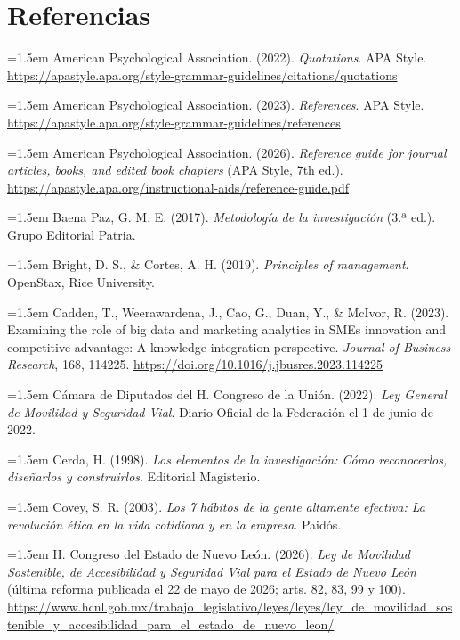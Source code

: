 {\clearpage\section*{Referencias}
\begingroup\small
\setlength{\parindent}{0pt}
\setlength{\parskip}{4pt}
\hangindent=1.5em American Psychological Association. (2022). \textit{Quotations}. APA Style. \url{https://apastyle.apa.org/style-grammar-guidelines/citations/quotations}

\hangindent=1.5em American Psychological Association. (2023). \textit{References}. APA Style. \url{https://apastyle.apa.org/style-grammar-guidelines/references}

\hangindent=1.5em American Psychological Association. (2026). \textit{Reference guide for journal articles, books, and edited book chapters} (APA Style, 7th ed.). \url{https://apastyle.apa.org/instructional-aids/reference-guide.pdf}

\hangindent=1.5em Baena Paz, G. M. E. (2017). \textit{Metodología de la investigación} (3.ª ed.). Grupo Editorial Patria.

\hangindent=1.5em Bright, D. S., \& Cortes, A. H. (2019). \textit{Principles of management}. OpenStax, Rice University.

\hangindent=1.5em Cadden, T., Weerawardena, J., Cao, G., Duan, Y., \& McIvor, R. (2023). Examining the role of big data and marketing analytics in SMEs innovation and competitive advantage: A knowledge integration perspective. \textit{Journal of Business Research}, 168, 114225. \url{https://doi.org/10.1016/j.jbusres.2023.114225}

\hangindent=1.5em Cámara de Diputados del H. Congreso de la Unión. (2022). \textit{Ley General de Movilidad y Seguridad Vial}. Diario Oficial de la Federación el 1 de junio de 2022.

\hangindent=1.5em Cerda, H. (1998). \textit{Los elementos de la investigación: Cómo reconocerlos, diseñarlos y construirlos}. Editorial Magisterio.

\hangindent=1.5em Covey, S. R. (2003). \textit{Los 7 hábitos de la gente altamente efectiva: La revolución ética en la vida cotidiana y en la empresa}. Paidós.

\hangindent=1.5em H. Congreso del Estado de Nuevo León. (2026). \textit{Ley de Movilidad Sostenible, de Accesibilidad y Seguridad Vial para el Estado de Nuevo León} (última reforma publicada el 22 de mayo de 2026; arts. 82, 83, 99 y 100). \url{https://www.hcnl.gob.mx/trabajo_legislativo/leyes/leyes/ley_de_movilidad_sostenible_y_accesibilidad_para_el_estado_de_nuevo_leon/}

}
